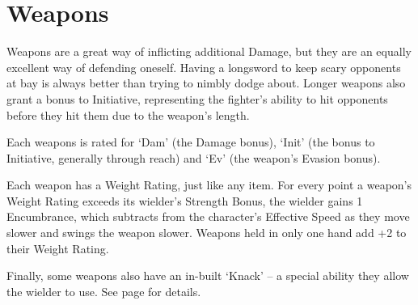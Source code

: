 \documentclass[titlepage,a4paper,openany]{book}
\begin{document}

\section{Weapons}

\begin{multicols}{2}

Weapons are a great way of inflicting additional Damage, but they are an equally excellent way of defending oneself. Having a longsword to keep scary opponents at bay is always better than trying to nimbly dodge about. Longer weapons also grant a bonus to Initiative, representing the fighter's ability to hit opponents before they hit them due to the weapon's length.

Each weapons is rated for `Dam' (the Damage bonus), `Init' (the bonus to Initiative, generally through reach) and `Ev' (the weapon's Evasion bonus).

Each weapon has a Weight Rating, just like any item. For every point a weapon's Weight Rating exceeds its wielder's Strength Bonus, the wielder gains 1 Encumbrance, which subtracts from the character's Effective Speed as they move slower and swings the weapon slower. Weapons held in only one hand add +2 to their Weight Rating.

Finally, some weapons also have an in-built `Knack' -- a special ability they allow the wielder to use.
See page \pageref{knacks} for details.

\end{multicols}
\end{document}
